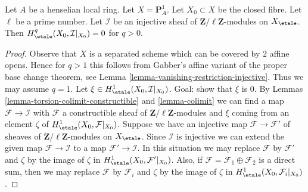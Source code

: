 \begin{lemma}
\label{lemma-efface-cohomology-on-fibre-by-finite-cover}
Let $A$ be a henselian local ring. Let $X = \mathbf{P}^1_A$.
Let $X_0 \subset X$ be the closed fibre. Let $\ell$ be a prime
number. Let $\mathcal{I}$ be an injective sheaf of
$\mathbf{Z}/\ell\mathbf{Z}$-modules on $X_\etale$. Then
$H^q_\etale(X_0, \mathcal{I}|_{X_0}) = 0$ for $q > 0$.
\end{lemma}

\begin{proof}
Observe that $X$ is a separated scheme which can be covered by $2$
affine opens. Hence for $q > 1$ this follows from Gabber's affine
variant of the proper base change theorem, see
Lemma \ref{lemma-vanishing-restriction-injective}.
Thus we may assume $q = 1$. Let
$\xi \in H^1_\etale(X_0, \mathcal{I}|_{X_0})$.
Goal: show that $\xi$ is $0$.
By Lemmas \ref{lemma-torsion-colimit-constructible} and
\ref{lemma-colimit} we can find a map $\mathcal{F} \to \mathcal{I}$
with $\mathcal{F}$ a constructible sheaf of
$\mathbf{Z}/\ell\mathbf{Z}$-modules
and $\xi$ coming from an element $\zeta$ of
$H^1_\etale(X_0, \mathcal{F}|_{X_0})$. Suppose we have an injective map
$\mathcal{F} \to \mathcal{F}'$ of sheaves of
$\mathbf{Z}/\ell\mathbf{Z}$-modules on $X_\etale$.
Since $\mathcal{I}$ is injective we can extend the given map
$\mathcal{F} \to \mathcal{I}$ to a map $\mathcal{F}' \to \mathcal{I}$.
In this situation we may replace $\mathcal{F}$ by $\mathcal{F}'$
and $\zeta$ by the image of $\zeta$ in $H^1_\etale(X_0, \mathcal{F}'|_{X_0})$.
Also, if $\mathcal{F} = \mathcal{F}_1 \oplus \mathcal{F}_2$ is a direct sum,
then we may replace $\mathcal{F}$ by $\mathcal{F}_i$
and $\zeta$ by the image of $\zeta$ in $H^1_\etale(X_0, \mathcal{F}_i|_{X_0})$.


\end{proof}
